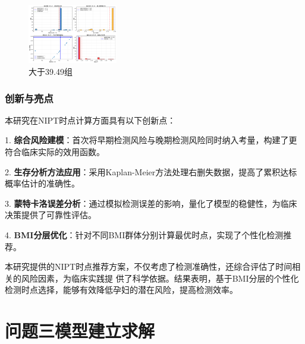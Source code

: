 \documentclass{article}
\begin{document}
\begin{figure}[H]  %
    \centering  %
    \includegraphics[width=0.35\textwidth]{graph/error_analysis_BMI__39.49.png}  %
    \caption{大于39.49组}  %
    \label{fig:single}  %
\end{figure}

\subsubsection{\textbf{创新与亮点}}
本研究在NIPT时点计算方面具有以下创新点：

1. \textbf{综合风险建模}：首次将早期检测风险与晚期检测风险同时纳入考量，构建了更符合临床实际的效用函数。

2. \textbf{生存分析方法应用}：采用Kaplan-Meier方法处理右删失数据，提高了累积达标概率估计的准确性。

3. \textbf{蒙特卡洛误差分析}：通过模拟检测误差的影响，量化了模型的稳健性，为临床决策提供了可靠性评估。

4. \textbf{BMI分层优化}：针对不同BMI群体分别计算最优时点，实现了个性化检测推荐。

本研究提供的NIPT时点推荐方案，不仅考虑了检测准确性，还综合评估了时间相关的风险因素，为临床实践提
供了科学依据。结果表明，基于BMI分层的个性化检测时点选择，能够有效降低孕妇的潜在风险，提高检测效率。
\section{\textbf{问题三模型建立求解}}
\end{document}

